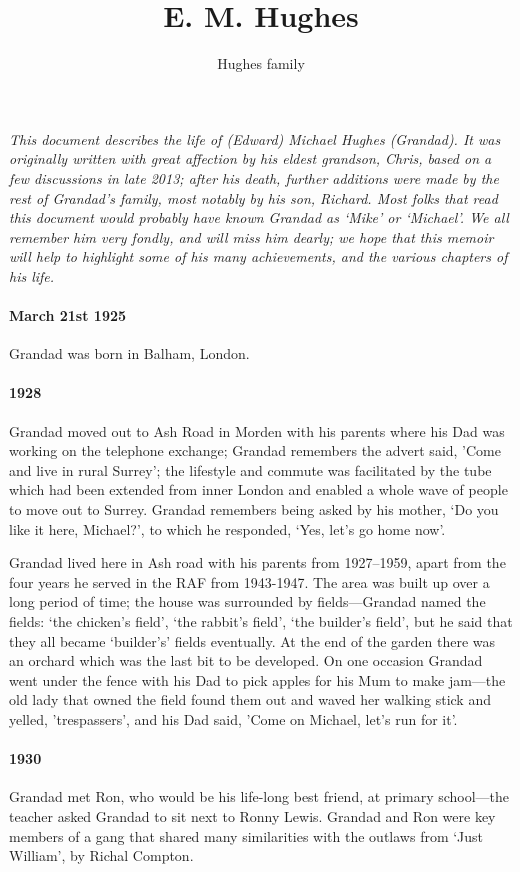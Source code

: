 \documentclass[11pt]{article}
\title{E. M. Hughes}
\author{Hughes family}
\begin{document}
\maketitle

{\itshape This document describes the life of (Edward) Michael Hughes (Grandad). It was 
originally written with great affection by his eldest grandson, Chris, based on a few discussions in late 2013; after 
his death, further additions were made by the rest of Grandad's family, most notably by his son, Richard. Most folks that read this 
document would probably have known Grandad as `Mike' or `Michael'. We all remember him very fondly, and will 
miss him dearly; we hope that this memoir will help to highlight some of his many achievements, and the
various chapters of his life.}


\paragraph{March 21st 1925} Grandad was born in Balham, London.
  \paragraph{1928} Grandad moved out to Ash Road in Morden with his parents where his Dad was working on the telephone exchange;
    Grandad remembers the advert said, 'Come and live in rural Surrey'; the lifestyle and commute was facilitated 
by the tube which had been extended from inner London and enabled a whole
wave of people to move out to Surrey. Grandad remembers being asked by 
his mother, `Do you like it here, Michael?', to which he responded, `Yes, let's go home now'.

Grandad lived here in Ash road with his parents from 1927--1959, apart from the four years he served
 in the RAF from 1943-1947.  The area was built up over a long period of time;
the house was surrounded by fields---Grandad named the fields: `the chicken's field', 
`the rabbit's field', `the builder's field', but he said that they all became `builder's' 
fields eventually. At the end of the garden there 
was an orchard which was the last bit to be developed. On one occasion Grandad went under the 
fence with his Dad to pick apples for his Mum to make jam---the old lady that owned the field
found them out and waved her walking stick and yelled, 'trespassers', and his 
Dad said, 'Come on Michael, let's run for it'. 

\paragraph{1930} Grandad met Ron, who would be his life-long best friend, at primary 
school---the teacher asked Grandad to sit next to Ronny Lewis. Grandad and Ron were key members 
of a gang that shared many similarities with the outlaws from `Just William', by Richal Compton. 
\end{document}

